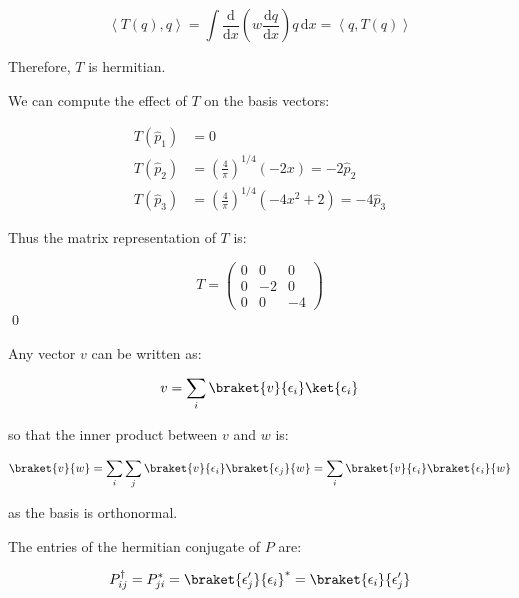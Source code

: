 \documentclass[12pt]{article}
\begin{document}
\begin{equation}
    \left\langle T(q), q \right\rangle = \int \frac{\mathrm{d}}{\mathrm{d}x} \left( w \frac{\mathrm{d}q}{\mathrm{d}x} \right) q \, \mathrm{d}x = \left\langle q, T(q) \right\rangle
\end{equation}

Therefore, $T$ is hermitian.

We can compute the effect of $T$ on the basis vectors:

\begin{equation}
\begin{split}
    T(\hat{p}_{1}) &= 0 \\
    T(\hat{p}_{2}) &= \left( \frac{4}{\pi} \right)^{1/4} (-2x) = -2 \hat{p}_{2} \\
    T(\hat{p}_{3}) &= \left( \frac{4}{\pi} \right)^{1/4} (-4x^{2} + 2) = -4 \hat{p}_{3}
\end{split}
\end{equation}

Thus the matrix representation of $T$ is:

\begin{equation}
    T =
    \begin{pmatrix}
        0 & 0 & 0 \\
        0 & -2 & 0 \\
        0 & 0 & -4
    \end{pmatrix}
\end{equation}
\qed



Any vector $v$ can be written as:

\begin{equation}
    v = \sum_{i} \braket{v}{\epsilon_{i}} \ket{\epsilon_{i}}
\end{equation}

so that the inner product between $v$ and $w$ is:

\begin{equation}
    \braket{v}{w} = \sum_{i} \sum_{j} \braket{v}{\epsilon_{i}} \braket{\epsilon_{j}}{w} = \sum_{i} \braket{v}{\epsilon_{i}} \braket{\epsilon_{i}}{w}
\end{equation}

as the basis is orthonormal.

The entries of the hermitian conjugate of $P$ are:

\begin{equation}
    P^{\dagger}_{ij} = P_{ji}^{*} = \braket{\epsilon'_{j}}{\epsilon_{i}}^{*} = \braket{\epsilon_{i}}{\epsilon'_{j}}
\end{equation}
\end{document}
